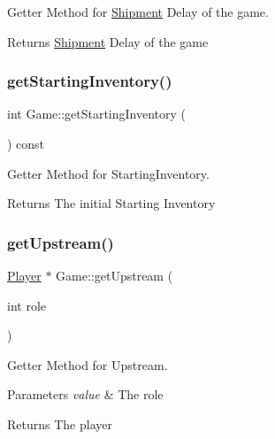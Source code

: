 Getter Method for \hyperlink{classShipment}{Shipment} Delay of the game. 

\begin{DoxyReturn}{Returns}
\hyperlink{classShipment}{Shipment} Delay of the game 
\end{DoxyReturn}
\mbox{\label{classGame_aab794be46d7e7d8832ca6b5430cd61e2}} 
\subsubsection{\texorpdfstring{get\+Starting\+Inventory()}{getStartingInventory()}}
{\footnotesize\ttfamily int Game\+::get\+Starting\+Inventory (\begin{DoxyParamCaption}{ }\end{DoxyParamCaption}) const}



Getter Method for Starting\+Inventory. 

\begin{DoxyReturn}{Returns}
The initial Starting Inventory 
\end{DoxyReturn}
\mbox{\label{classGame_ac055ae02c6ab4a4f2a6099da86b97932}} 
\subsubsection{\texorpdfstring{get\+Upstream()}{getUpstream()}}
{\footnotesize\ttfamily \hyperlink{classPlayer}{Player} $\ast$ Game\+::get\+Upstream (\begin{DoxyParamCaption}\item[{int}]{role }\end{DoxyParamCaption})}



Getter Method for Upstream. 


\begin{DoxyParams}{Parameters}
{\em value} & The role \\
\hline
\end{DoxyParams}
\begin{DoxyReturn}{Returns}
The player 
\end{DoxyReturn}
\mbox{\label{classGame_a3a9810e55fb1b4b5df6c887811c73885}} 

